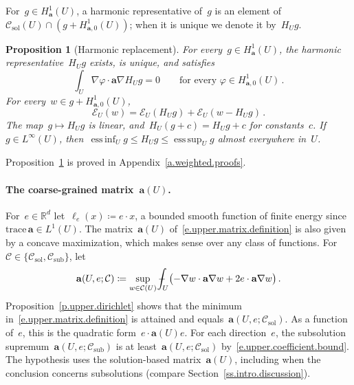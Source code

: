 \documentclass[11pt,letterpaper]{article}
\numberwithin{equation}{section}
\newtheorem{proposition}[theorem]{Proposition}
\theoremstyle{definition}
\newcommand{\Rd}{\mathbb{R}^d}
\renewcommand{\a}{\mathbf{a}}
\newcommand*{\tr}{\mathrm{trace\,}}
\DeclareMathOperator*{\esssup}{ess\,sup}
\DeclareMathOperator*{\essinf}{ess\,inf}
\newcommand{\Ener}{\mathcal E}
\newcommand{\Hzero}[1]{H^1_{#1,0}}
\newcommand{\Csol}{\mathcal C_{\mathrm{sol}}}
\newcommand{\Csub}{\mathcal C_{\mathrm{sub}}}
\def\Xint#1{\mathchoice
	{\XXint\displaystyle\textstyle{#1}}%
	{\XXint\textstyle\scriptstyle{#1}}%
	{\XXint\scriptstyle\scriptscriptstyle{#1}}%
	{\XXint\scriptscriptstyle\scriptscriptstyle{#1}}%
	\!\int}
\def\XXint#1#2#3{{\setbox0=\hbox{$#1{#2#3}{\int}$}
		\vcenter{\hbox{$#2#3$}}\kern-.5\wd0}}
\def\fint{\Xint-}
\begin{document}
\smallskip

For~$g\in H^1_\a(U)$, a harmonic representative of~$g$ is an element of~$\Csol(U)\cap(g+\Hzero{\a}(U))$; when it is unique we denote it by~$H_Ug$.

\begin{proposition}[Harmonic replacement]
\label{p.harmonic.replacement}
For every~$g\in H^1_\a(U)$, the harmonic representative~$H_Ug$ exists, is unique, and satisfies
\begin{equation}
	\int_U\nabla\varphi\cdot\a\nabla H_Ug=0\qquad\mbox{for every }\varphi\in\Hzero{\a}(U)\,.
	\label{e.harmonic.orthogonality}
\end{equation}
For every~$w\in g+\Hzero{\a}(U)$,
\begin{equation}
	\Ener_U(w)=\Ener_U(H_Ug)+\Ener_U(w-H_Ug)\,.
	\label{e.harmonic.minimization}
\end{equation}
The map~$g\mapsto H_Ug$ is linear, and~$H_U(g+c)=H_Ug+c$ for constants~$c$. If~$g\in L^\infty(U)$, then~$\essinf_Ug\leq H_Ug\leq\esssup_Ug$ almost everywhere in~$U$.
\end{proposition}

Proposition~\ref{p.harmonic.replacement} is proved in Appendix~\ref{a.weighted.proofs}.

\paragraph{The coarse-grained matrix~$\a(U)$.} For~$e\in\Rd$ let~$\ell_e(x)\coloneqq e\cdot x$, a bounded smooth function of finite energy since~$\tr\a\in L^1(U)$. The matrix~$\a(U)$ of~\eqref{e.upper.matrix.definition} is also given by a concave maximization, which makes sense over any class of functions. For~$\mathcal C\in\{\Csol,\Csub\}$, let
\begin{equation}
	\a(U,e;\mathcal C)\coloneqq\sup_{w\in\mathcal C(U)}\fint_U\bigl(-\nabla w\cdot\a\nabla w+2e\cdot\a\nabla w\bigr)\,.
	\label{e.upper.directional.definition}
\end{equation}
Proposition~\ref{p.upper.dirichlet} shows that the minimum in~\eqref{e.upper.matrix.definition} is attained and equals~$\a(U,e;\Csol)$. As a function of~$e$, this is the quadratic form~$e\cdot\a(U)e$. For each direction~$e$, the subsolution supremum~$\a(U,e;\Csub)$ is at least~$\a(U,e;\Csol)$ by~\eqref{e.upper.coefficient.bound}. The hypothesis uses the solution-based matrix~$\a(U)$, including when the conclusion concerns subsolutions (compare Section~\ref{ss.intro.discussion}).
\end{document}
